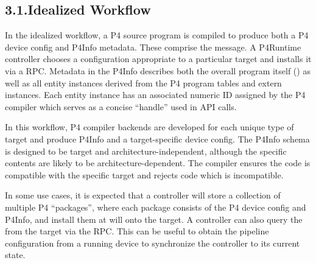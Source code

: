 \documentclass[11pt]{article}
\begin{document}
{%
\subsection{3.1.\hspace*{0.5em}Idealized Workflow}\label{sec-idealized-workflow}%

\noindent{}In the idealized workflow, a P4 source program is compiled to produce both a P4
device config and P4Info metadata. These comprise the 
message. A P4Runtime controller chooses a configuration appropriate to a
particular target and installs it via a 
RPC. Metadata in the P4Info describes both the overall program itself
() as well as all entity instances derived from the P4 program \textemdash{}
tables and extern instances. Each entity instance has an associated numeric ID
assigned by the P4 compiler which serves as a concise \textquotedblleft{}handle\textquotedblright{} used in API
calls.%

In this workflow, P4 compiler backends are developed for each unique type of
target and produce P4Info and a target-specific device config. The P4Info schema
is designed to be target and architecture-independent, although the specific
contents are likely to be architecture-dependent. The compiler ensures the code
is compatible with the specific target and rejects code which is incompatible.%

In some use cases, it is expected that a controller will store a
collection of multiple P4 \textquotedblleft{}packages\textquotedblright{}, where each package consists of
the P4 device config and P4Info, and install them at will onto the target. A
controller can also query the  from the target via the
 RPC. This can be useful to obtain the pipeline
configuration from a running device to synchronize the controller to its current
state.%

}
\end{document}
